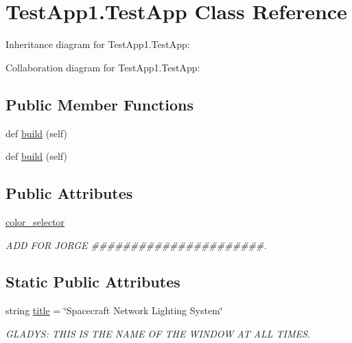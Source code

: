 \hypertarget{classTestApp1_1_1TestApp}{}\section{Test\+App1.\+Test\+App Class Reference}
\label{classTestApp1_1_1TestApp}


Inheritance diagram for Test\+App1.\+Test\+App\+:


Collaboration diagram for Test\+App1.\+Test\+App\+:
\subsection*{Public Member Functions}
\begin{DoxyCompactItemize}
\item 
def \hyperlink{classTestApp1_1_1TestApp_a3f9852f574a1b9273b95c63de9dbfc64}{build} (self)
\item 
def \hyperlink{classTestApp1_1_1TestApp_a3f9852f574a1b9273b95c63de9dbfc64}{build} (self)
\end{DoxyCompactItemize}
\subsection*{Public Attributes}
\begin{DoxyCompactItemize}
\item 
\hyperlink{classTestApp1_1_1TestApp_ae5720fcd4df297369b20a20955d8c388}{color\+\_\+selector}
\begin{DoxyCompactList}\small\item\em A\+DD F\+OR J\+O\+R\+GE \#\#\#\#\#\#\#\#\#\#\#\#\#\#\#\#\#\#\#\#\#\#. \end{DoxyCompactList}\end{DoxyCompactItemize}
\subsection*{Static Public Attributes}
\begin{DoxyCompactItemize}
\item 
string \hyperlink{classTestApp1_1_1TestApp_a9880f4943b84ff291beca794581e7ba1}{title} = \char`\"{}Spacecraft Network Lighting System\char`\"{}
\begin{DoxyCompactList}\small\item\em G\+L\+A\+D\+YS\+: T\+H\+IS IS T\+HE N\+A\+ME OF T\+HE W\+I\+N\+D\+OW AT A\+LL T\+I\+M\+ES. \end{DoxyCompactList}\end{DoxyCompactItemize}


